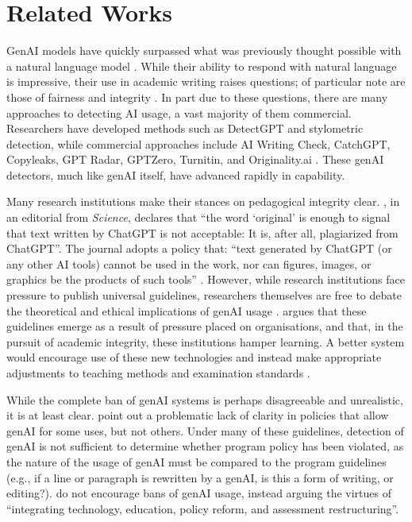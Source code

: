 \section{Related Works}\label{sec:rw}
GenAI models have quickly surpassed what was previously thought possible with a natural language model \cite{brown_language_2020,chowdhery_palm_2022,openai_gpt-4_2023}. While their ability to respond with natural language is impressive, their use in academic writing raises questions; of particular note are those of fairness and integrity \cite{hu_challenges_2023}. In part due to these questions, there are many approaches to detecting AI usage, a vast majority of them commercial. Researchers have developed methods such as DetectGPT and stylometric detection, while commercial approaches include AI Writing Check, CatchGPT, Copyleaks, GPT Radar, GPTZero,  Turnitin, and Originality.ai \cite{mitchell_detectgpt_2023,kalpesh_krishna_paraphrasing_2023,tharindu_kumarage_stylometric_2023,gptzero_gptzero_2023,kirchner_new_2023}. These genAI detectors, much like genAI itself, have advanced rapidly in capability.

Many research institutions make their stances on pedagogical integrity clear. \textcite{h_holden_thorp_chatgpt_2023}, in an editorial from \emph{Science}, declares that ``the word `original' is enough to signal that text written by ChatGPT is not acceptable: It is, after all, plagiarized from ChatGPT''. The journal adopts a policy that: ``text generated by ChatGPT (or any other AI tools) cannot be used in the work, nor can figures, images, or graphics be the products of such tools'' \cite{h_holden_thorp_chatgpt_2023}. However, while research institutions face pressure to publish universal guidelines, researchers themselves are free to debate the theoretical and ethical implications of genAI usage \cite{lav_r_varshney_limits_2020,h_holden_thorp_chatgpt_2023,yu_huang_reflection_2023,weber-wulff_testing_2023,otterbacher_why_2023}. \textcite{yu_huang_reflection_2023} argues that these guidelines emerge as a result of pressure placed on organisations, and that, in the pursuit of academic integrity, these institutions hamper learning. A better system would encourage use of these new technologies and instead make appropriate adjustments to teaching methods and examination standards 
\cite{yu_huang_reflection_2023}. 

While the complete ban of genAI systems is perhaps disagreeable and unrealistic, it is at least clear. \textcite{mike_perkins_decoding_2023} point out a problematic lack of clarity in policies that allow genAI for some uses, but not others. Under many of these guidelines, detection of genAI is not sufficient to determine whether program policy has been violated, as the nature of the usage of genAI must be compared to the program guidelines (e.g., if a line or paragraph is rewritten by a genAI, is this a form of writing, or editing?). \textcite{mike_perkins_decoding_2023} do not encourage bans of genAI usage, instead arguing the virtues of ``integrating technology, education, policy reform, and assessment restructuring''.

